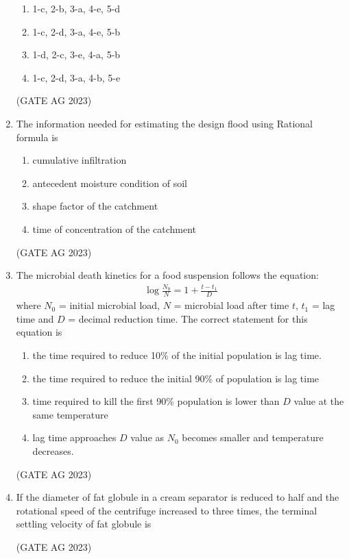\documentclass[journal,12pt,onecolumn]{IEEEtran}
\theoremstyle{remark}
\begin{document}
\begin{enumerate}
\begin{enumerate}
    \item 1-c, 2-b, 3-a, 4-e, 5-d
    \item 1-c, 2-d, 3-a, 4-e, 5-b
    \item 1-d, 2-c, 3-e, 4-a, 5-b
    \item 1-c, 2-d, 3-a, 4-b, 5-e
\end{enumerate}
\hfill{(GATE AG 2023)}

\item The information needed for estimating the design flood using Rational formula is
\begin{enumerate}
    \item cumulative infiltration
    \item antecedent moisture condition of soil
    \item shape factor of the catchment
    \item time of concentration of the catchment
\end{enumerate}
\hfill{(GATE AG 2023)}

\item The microbial death kinetics for a food suspension follows the equation:
    \begin{align*}
    \log \frac{N_{0}}{N} = 1 + \frac{t-t_{1}}{D} 
    \end{align*}
    where $N_{0}$ = initial microbial load, $N$ = microbial load after time $t$, $t_{1}$ = lag time and $D$ = decimal reduction time.
    The correct statement for this equation is
    \begin{enumerate}
        \item the time required to reduce 10\% of the initial population is lag time.
        \item the time required to reduce the initial 90\% of population is lag time
        \item time required to kill the first 90\% population is lower than $D$ value at the same temperature
        \item lag time approaches $D$ value as $N_{0}$ becomes smaller and temperature decreases.
    \end{enumerate}
\hfill{(GATE AG 2023)}

    \item If the diameter of fat globule in a cream separator is reduced to half and the rotational speed of the centrifuge increased to three times, the terminal settling velocity of fat globule is
    \begin{enumerate}
    \end{enumerate}
\hfill{(GATE AG 2023)}


\end{enumerate}
\end{document}
